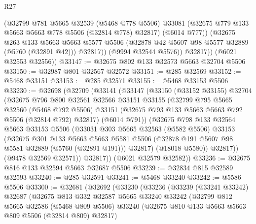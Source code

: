 \begin{lexlean}{R27}
\begin{coremodule}
              (@32799
                @781
                @5665
                @32539
                (@5468 @778 @5506)
                @33081
                (@32675 @779 @133 @5663 @5663 @778 @5506 (@32814 @778) @32817)
                (@6014 @777))
              (@32675
                @263
                @133
                @5663
                @5663
                @5577
                @5506
                (@32878 @42 @5607 @98 @5577 @32889 (@5760 (@32891 @42)))
                @32817))
            (@9994 @32544 @5576))
          @32817))
      (@6021 @32553 @32556))
@33147 := @32675 @802 @133 @32573 @5663 @32704 @5506
@33150 := @32987 @801 @32567 @32572
@33151 := @285 @32569
@33152 := @5468 @33151
@33153 := @285 @32571
@33155 := @5468 @33153 @5506
@33230 := @32698
    (@32709
      (@33141
        (@33147
          (@33150
            (@33152 @33155)
            @32704
            (@32675
              @796
              @800
              @32561
              @32566
              @33151
              @33155
              (@32799
                @795
                @5665
                @32560
                (@5468 @792 @5506)
                @33151
                (@32675 @793 @133 @5663 @5663 @792 @5506 (@32814 @792) @32817)
                (@6014 @791))
              (@32675
                @798
                @133
                @32564
                @5663
                @33153
                @5506
                (@33031
                  @303
                  @5665
                  @32563
                  (@5582 @5506)
                  @33153
                  (@32675
                    @301
                    @133
                    @5663
                    @5663
                    @5581
                    @5506
                    (@32878 @191 @5607 @98 @5581 @32889 (@5760 (@32891 @191)))
                    @32817)
                  (@18018 @5580))
                @32817))
            (@9478 @32569 @32571))
          @32817))
      (@6021 @32579 @32582))
@33236 := @32675 @816 @133 @32594 @5663 @32687 @5506
@33239 := @32834 @815 @32589 @32593
@33240 := @285 @32591
@33241 := @5468 @33240
@33242 := @5586 @5506
@33300 := @32681
    (@32692
      (@33230
        (@33236
          (@33239
            (@33241 @33242)
            @32687
            (@32675
              @813
              @332
              @32587
              @5665
              @33240
              @33242
              (@32799
                @812
                @5665
                @32586
                (@5468 @809 @5506)
                @33240
                (@32675 @810 @133 @5663 @5663 @809 @5506 (@32814 @809) @32817)

\end{coremodule}
\end{lexlean}
